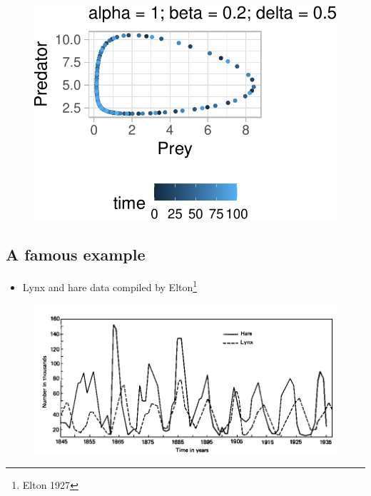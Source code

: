\documentclass[
  letterpaper,
  DIV=11,
  numbers=noendperiod]{scrartcl}
\providecommand{\tightlist}{%
  \setlength{\itemsep}{0pt}\setlength{\parskip}{0pt}}\usepackage{longtable,booktabs,array}
\begin{document}
\begin{figure}[H]

{\centering \includegraphics{ecological_interactions_files/figure-pdf/unnamed-chunk-13-1.pdf}

}

\end{figure}

\hypertarget{a-famous-example}{%
\subsection{A famous example}\label{a-famous-example}}

\begin{itemize}
\tightlist
\item
  Lynx and hare data compiled by Elton\footnote{Elton 1927}
\end{itemize}

\begin{figure}

{\centering \includegraphics{images/lynx_hare.png}

}

\end{figure}
\end{document}
